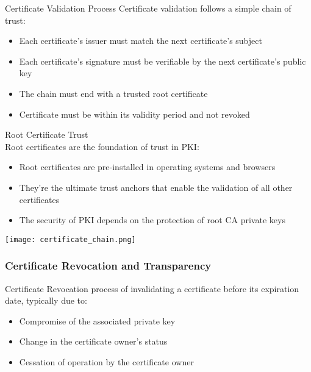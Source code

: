 \begin{concept}{Certificate Validation Process}
Certificate validation follows a simple chain of trust:
\begin{itemize}
    \item Each certificate's issuer must match the next certificate's subject
    \item Each certificate's signature must be verifiable by the next certificate's public key
    \item The chain must end with a trusted root certificate
    \item Certificate must be within its validity period and not revoked
\end{itemize}
\end{concept}

\begin{theorem}{Root Certificate Trust}\\
Root certificates are the foundation of trust in PKI:
\begin{itemize}
    \item Root certificates are pre-installed in operating systems and browsers
    \item They're the ultimate trust anchors that enable the validation of all other certificates
    \item The security of PKI depends on the protection of root CA private keys
\end{itemize}
\end{theorem}





\texttt{[image: certificate\_chain.png]}

\multend









\subsubsection{Certificate Revocation and Transparency}



\begin{definition}{Certificate Revocation}
     process of invalidating a certificate before its expiration date, typically due to:
\begin{itemize}
    \item Compromise of the associated private key
    \item Change in the certificate owner's status
    \item Cessation of operation by the certificate owner
\end{itemize}
\end{definition}

